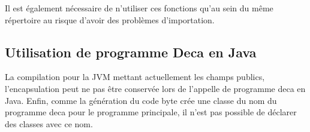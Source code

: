 \documentclass[12pt, a4paper, one side]{article}
\begin{document}
    Il est également nécessaire de n'utiliser ces fonctions qu'au sein du même répertoire au risque d'avoir des problèmes d'importation.

    \subsection{Utilisation de programme Deca en Java}
    La compilation pour la JVM mettant actuellement les champs publics, l'encapsulation peut ne pas être conservée lors de l'appelle de programme deca en Java.
    Enfin, comme la génération du code byte crée une classe du nom du programme deca pour le programme principale, il n'est pas possible de déclarer des classes avec ce nom.

    \newpage
    \printbibliography
\end{document}
